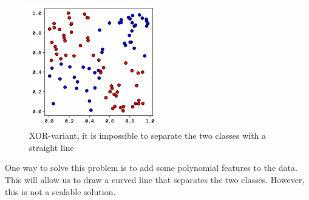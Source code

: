 \documentclass[twoside,11pt]{report}
\begin{document}
\begin{figure}[h]
    \begin{center}
        \includegraphics[width=0.5\textwidth]{../runsAndFigures/xor.png}
    \end{center}
    \caption{XOR-variant, it is impossible to separate the two classes with a straight line}\label{fig:xor_data}
\end{figure}


One way to solve this problem is to add some polynomial features to the data. 
This will allow us to draw a curved line that separates the two classes. However, this is not a scalable solution.
\end{document}
